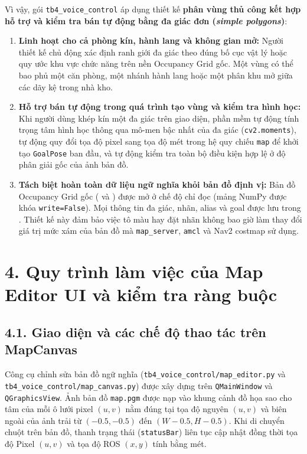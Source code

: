 Vì vậy, gói \texttt{tb4\_voice\_control} áp dụng thiết kế \textbf{phân vùng thủ công kết hợp hỗ trợ và kiểm tra bán tự động bằng đa giác đơn (\textit{simple polygons})}:
\begin{enumerate}[leftmargin=1.2cm]
  \item \textbf{Linh hoạt cho cả phòng kín, hành lang và không gian mở:} Người thiết kế chủ động xác định ranh giới đa giác theo đúng bố cục vật lý hoặc quy ước khu vực chức năng trên nền Occupancy Grid gốc. Một vùng có thể bao phủ một căn phòng, một nhánh hành lang hoặc một phân khu mở giữa các dãy kệ trong nhà kho.
  \item \textbf{Hỗ trợ bán tự động trong quá trình tạo vùng và kiểm tra hình học:} Khi người dùng khép kín một đa giác trên giao diện, phần mềm tự động tính trọng tâm hình học thông qua mô-men bậc nhất của đa giác (\texttt{cv2.moments}), tự động quy đổi tọa độ pixel sang tọa độ mét trong hệ quy chiếu \texttt{map} để khởi tạo \texttt{GoalPose} ban đầu, và tự động kiểm tra toàn bộ điều kiện hợp lệ ở độ phân giải gốc của ảnh bản đồ.
  \item \textbf{Tách biệt hoàn toàn dữ liệu ngữ nghĩa khỏi bản đồ định vị:} Bản đồ Occupancy Grid gốc ( và ) được mở ở chế độ chỉ đọc (mảng NumPy được khóa \texttt{write=False}). Mọi thông tin đa giác, nhãn, alias và goal được lưu trong . Thiết kế này đảm bảo việc tô màu hay đặt nhãn không bao giờ làm thay đổi giá trị mức xám của bản đồ mà \texttt{map\_server}, \texttt{amcl} và Nav2 costmap sử dụng.
\end{enumerate}

\section*{4. Quy trình làm việc của Map Editor UI và kiểm tra ràng buộc}

\subsection*{4.1. Giao diện và các chế độ thao tác trên MapCanvas}

Công cụ chỉnh sửa bản đồ ngữ nghĩa (\texttt{tb4\_voice\_control/map\_editor.py} và \texttt{tb4\_voice\_control/map\_canvas.py}) được xây dựng trên \texttt{QMainWindow} và \texttt{QGraphicsView}. Ảnh bản đồ \texttt{map.pgm} được nạp vào khung cảnh đồ họa sao cho tâm của mỗi ô lưới pixel $(u, v)$ nằm đúng tại tọa độ nguyên $(u, v)$ và biên ngoài của ảnh trải từ $(-0.5, -0.5)$ đến $(W - 0.5, H - 0.5)$. Khi di chuyển chuột trên bản đồ, thanh trạng thái (\texttt{statusBar}) liên tục cập nhật đồng thời tọa độ Pixel $(u, v)$ và tọa độ ROS $(x, y)$ tính bằng mét.


